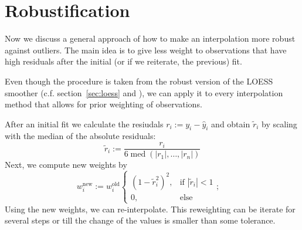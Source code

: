 \section{Robustification}{
	\label{sec:loess_robustify}
	{ %
		Now we discuss a general approach of how to make an interpolation more robust against outliers. The main idea is to give less weight to observations that have high residuals after the initial (or if we reiterate, the previous) fit.

		Even though the procedure is taken from the robust version of the LOESS smoother (c.f. section~\ref{sec:loess} and \cite{clevelandRobustLocallyWeighted1979}), we can apply it to every interpolation method that allows for prior weighting of observations.
	}
	
	{	
		After an initial fit we calculate the resiudals $r_i := y_i - \hat y_i$ and obtain $\tilde r_i$ by scaling with the median of the absolute residuals: 
		\begin{equation}
			\tilde r_i := \frac{r_i}{6\operatorname{med}\left(|r_1|,\dots,|r_n|\right)}
		\end{equation}
		Next, we compute new weights by
		\begin{equation}
			w_i^\text{new}:=w_i^\text{old} \begin{cases}
				\left(1-\tilde r_i^{2}\right)^{2}, & \text{if } |\tilde r_i|<1 \\
				0,                        & \text{else }
			\end{cases};\quad
			\label{eq:bisquare}
		\end{equation}
		Using the new weights, we can re-interpolate. This reweighting can be iterate for several steps or till the change of the values is smaller than some tolerance.

	}

}
